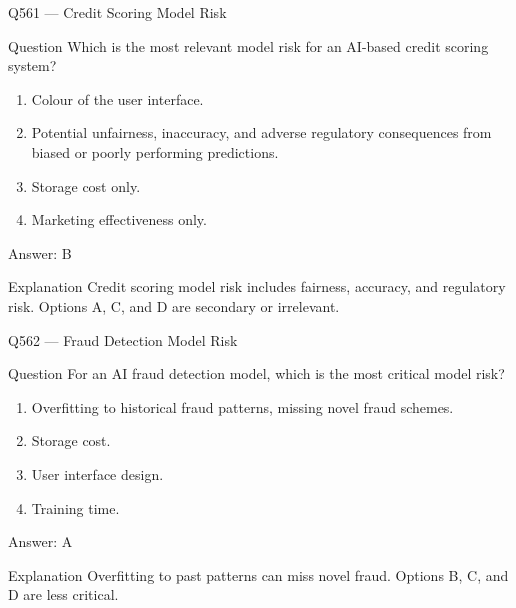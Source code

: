 \documentclass[aspectratio=169,8pt]{beamer}
\begin{document}
	\begin{frame}{Q561 --- Credit Scoring Model Risk}
		\begin{block}{Question}
			Which is the most relevant model risk for an AI-based credit scoring system?
			\begin{enumerate}
				\item Colour of the user interface.
				\item Potential unfairness, inaccuracy, and adverse regulatory consequences from biased or poorly performing predictions.
				\item Storage cost only.
				\item Marketing effectiveness only.
			\end{enumerate}
		\end{block}
		\begin{exampleblock}{Answer: B}\end{exampleblock}
		\begin{block}{Explanation}
			Credit scoring model risk includes fairness, accuracy, and regulatory risk. Options A, C, and D are secondary or irrelevant.
		\end{block}
	\end{frame}
	
	\begin{frame}{Q562 --- Fraud Detection Model Risk}
		\begin{block}{Question}
			For an AI fraud detection model, which is the most critical model risk?
			\begin{enumerate}
				\item Overfitting to historical fraud patterns, missing novel fraud schemes.
				\item Storage cost.
				\item User interface design.
				\item Training time.
			\end{enumerate}
		\end{block}
		\begin{exampleblock}{Answer: A}\end{exampleblock}
		\begin{block}{Explanation}
			Overfitting to past patterns can miss novel fraud. Options B, C, and D are less critical.
		\end{block}
	\end{frame}
	
\end{document}
